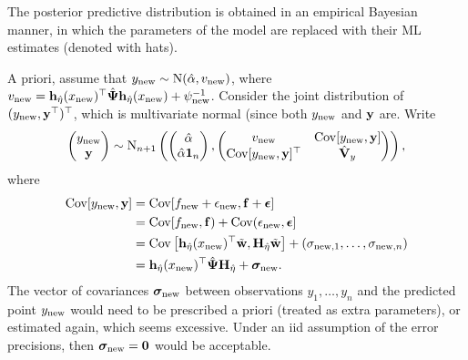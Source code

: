 The posterior predictive distribution is obtained in an empirical Bayesian manner, in which the parameters of the model are replaced with their ML estimates (denoted with hats).


A priori, assume that $y_{\text{new}} \sim \operatorname{N}(\hat\alpha, v_{\text{new}})$, where $v_{\text{new}} =  {\mathbf h}_{\hat\eta}(x_{\text{new}})^\top \hat{{\bm\Psi}} {\mathbf h}_{\hat\eta}(x_{\text{new}}) + \psi^{-1}_{\text{new}} $.
Consider the joint distribution of $(y_{\text{new}},{\mathbf y}^\top)^\top$, which is multivariate normal (since both $y_{\text{new}}$ and ${\mathbf y}$ are.
Write
\[
  \begin{pmatrix}
    y_{\text{new}} \\
    {\mathbf y}
  \end{pmatrix}
  \sim \operatorname{N}_{n+1}
  \left(
    \begin{pmatrix}
      \hat\alpha \\
      \hat\alpha{\mathbf 1}_n
    \end{pmatrix},
    \begin{pmatrix}
      v_{\text{new}} &\operatorname{Cov}[y_{\text{new}},{\mathbf y}] \\
      \operatorname{Cov}[y_{\text{new}},{\mathbf y}]^\top &\hat{{\mathbf V}}_y \\
    \end{pmatrix}
  \right),
\]
where 
\begin{align*}
  \operatorname{Cov}[y_{\text{new}},{\mathbf y}]
  &= \operatorname{Cov}[f_{\text{new}} + \epsilon_{\text{new}}, {\mathbf f} + {\bm\epsilon}] \\
  &= \operatorname{Cov}[f_{\text{new}}, {\mathbf f}) + \operatorname{Cov}(\epsilon_{\text{new}}, {\bm\epsilon}] \\
  &= \operatorname{Cov}\left[{\mathbf h}_{\hat\eta}(x_{\text{new}})^\top \tilde{\mathbf w},{\mathbf H}_{\hat\eta}\tilde{\mathbf w} \right] + (\sigma_{{\text{new}},1},\dots,\sigma_{{\text{new}},n}) \\
  &= {\mathbf h}_{\hat\eta}(x_{\text{new}})^\top\hat{{\bm\Psi}}{\mathbf H}_{\hat\eta} + {\bm\sigma}_{\text{new}}.
\end{align*}
The vector of covariances ${\bm\sigma}_{\text{new}}$ between observations $y_1,\dots,y_n$ and the predicted point $y_{\text{new}}$ would need to be prescribed a priori (treated as extra parameters), or estimated again, which seems excessive.
Under an iid assumption of the error precisions, then ${\bm\sigma}_{\text{new}} = {\mathbf 0}$ would be acceptable.

